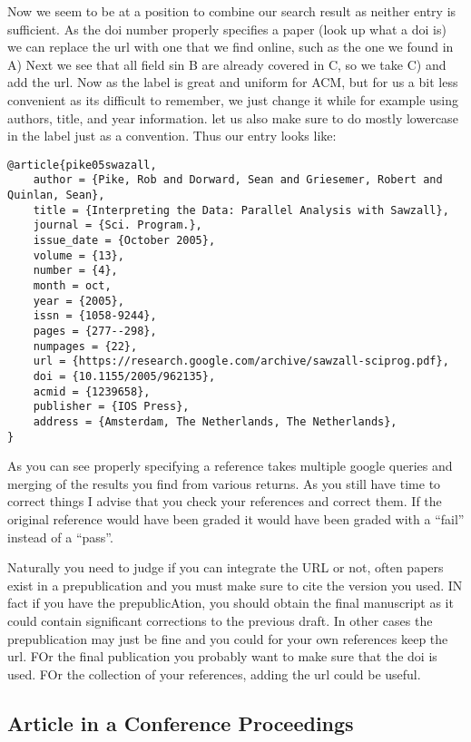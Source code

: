 Now we seem to be at a position to combine our search result as neither
entry is sufficient. As the doi number properly specifies a paper (look
up what a doi is) we can replace the url with one that we find online,
such as the one we found in A) Next we see that all field sin B are
already covered in C, so we take C) and add the url. Now as the label is
great and uniform for ACM, but for us a bit less convenient as its
difficult to remember, we just change it while for example using
authors, title, and year information. let us also make sure to do mostly
lowercase in the label just as a convention. Thus our entry looks like:

\begin{verbatim}
@article{pike05swazall,
    author = {Pike, Rob and Dorward, Sean and Griesemer, Robert and Quinlan, Sean},
    title = {Interpreting the Data: Parallel Analysis with Sawzall},
    journal = {Sci. Program.},
    issue_date = {October 2005},
    volume = {13},
    number = {4},
    month = oct,
    year = {2005},
    issn = {1058-9244},
    pages = {277--298},
    numpages = {22},
    url = {https://research.google.com/archive/sawzall-sciprog.pdf},
    doi = {10.1155/2005/962135},
    acmid = {1239658},
    publisher = {IOS Press},
    address = {Amsterdam, The Netherlands, The Netherlands},
}
\end{verbatim}

As you can see properly specifying a reference takes multiple google
queries and merging of the results you find from various returns. As
you still have time to correct things I advise that you check your
references and correct them. If the original reference would have been
graded it would have been graded with a ``fail'' instead of a ``pass''.

Naturally you need to judge if you can integrate the URL or not, often
papers exist in a prepublication and you must make sure to cite the
version you used. IN fact if you have the prepublicAtion, you should
obtain the final manuscript as it could contain significant
corrections to the previous draft. In other cases the prepublication
may just be fine and you could for your own references keep the
url. FOr the final publication you probably want to make sure that the
doi is used. FOr the collection of your references, adding the url
could be useful.

\subsection{Article in a Conference Proceedings}
\label{s:e:article-in-a-conference-proceedings}

